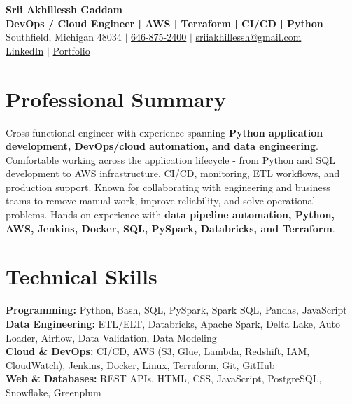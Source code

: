 \documentclass[letterpaper,10pt]{article}
\begin{document}
\fontsize{9.35pt}{10.45pt}\selectfont

\begin{center}
    {\LARGE \textbf{Srii Akhillessh Gaddam}} \\[-1pt]
    \textbf{DevOps / Cloud Engineer | AWS | Terraform | CI/CD | Python} \\[2pt]
    Southfield, Michigan 48034 $|$
    \href{tel:6468752400}{646-875-2400} $|$
    \href{mailto:sriiakhillessh@gmail.com}{sriiakhillessh@gmail.com} \\[1pt]
    \href{https://www.linkedin.com/in/srii-akhiilessh-gaddam-b48668191/}{LinkedIn} $|$
    \href{https://sriiakhillesshg.github.io/portfolio/}{Portfolio}
\end{center}
\vspace{-8pt}

\section{Professional Summary}
\small{Cross-functional engineer with experience spanning \textbf{Python application development, DevOps/cloud automation, and data engineering}. Comfortable working across the application lifecycle - from Python and SQL development to AWS infrastructure, CI/CD, monitoring, ETL workflows, and production support. Known for collaborating with engineering and business teams to remove manual work, improve reliability, and solve operational problems. Hands-on experience with \textbf{data pipeline automation, Python, AWS, Jenkins, Docker, SQL, PySpark, Databricks, and Terraform}.}

\section{Technical Skills}
\small{
\textbf{Programming:} Python, Bash, SQL, PySpark, Spark SQL, Pandas, JavaScript \\
\textbf{Data Engineering:} ETL/ELT, Databricks, Apache Spark, Delta Lake, Auto Loader, Airflow, Data Validation, Data Modeling \\
\textbf{Cloud \& DevOps:} CI/CD, AWS (S3, Glue, Lambda, Redshift, IAM, CloudWatch), Jenkins, Docker, Linux, Terraform, Git, GitHub \\
\textbf{Web \& Databases:} REST APIs, HTML, CSS, JavaScript, PostgreSQL, Snowflake, Greenplum
}
\end{document}
